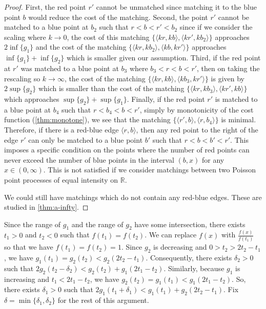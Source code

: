 \documentclass{article}
\newcommand{\R}{\mathbb{R}}
\begin{document}
\begin{proof}
    First, the red point $r'$ cannot be unmatched since
    matching it to the blue point $b$ would reduce the cost of the
    matching.
    Second, the point $r'$ cannot be matched to a blue point at $b_2$
    such that  $r<b<r'<b_2$ since
    if we consider the scaling where $k\rightarrow 0$, the cost of
    this matching $\{\langle kr,kb \rangle,\langle kr',kb_2 \rangle\}$ approaches $2\inf\{g_1\}$ and the cost of the matching $\{\langle kr,kb_2 \rangle,\langle kb,kr' \rangle\}$ approaches
    $\inf\{g_1\}+\inf\{g_2\}$ which is smaller given our assumption.
    Third, if the red point at $r'$ was matched to a blue point at
    $b_3$ where $b_3<r<b<r'$, then on taking the rescaling so
    $k\rightarrow\infty$, the cost of the matching $\{\langle kr,kb
    \rangle,\langle kb_3,kr' \rangle\}$ is given by $2\sup\{g_2\}$
    which is smaller than the cost of the matching $\{\langle kr,kb_3
    \rangle,\langle kr',kb \rangle\}$ which approaches
    $\sup\{g_2\}+\sup\{g_1\}$.
    Finally, if the red point $r'$ is matched to a blue point at $b_4$
    such that $r<b_4<b<r'$, simply by monotonicity of the cost function
    (\cref{thm:monotone}), we see that the matching $\{\langle r',b
    \rangle,\langle r,b_4 \rangle\}$ is minimal.
    Therefore, if there is a red-blue edge $\langle r,b \rangle$, then any red point to the
    right of the edge $r'$ can only be matched to a blue point $b'$
    such that $r<b<b'<r'$. This imposes a specific condition on the
    points where the number of red points can never exceed the number
    of blue points in the interval $(b,x)$ for any $x\in(0,\infty)$.
    This is not satisfied if we consider matchings between two Poisson
    point processes of equal intensity on $\R$.

    We could still have matchings which do not contain any red-blue
    edges. These are studied in \cref{thm:a-infty}.
  \end{proof}

  Since the range of
  $g_1$ and the range of $g_2$ have some intersection,
  there exists $t_1>0$ and $t_2<0$ such that $f(t_1)=f(t_2)$. We can replace $f(x)$ with
  $\frac{f(x)}{f(t_1)}$ so that we have  $f(t_1)=f(t_2)=1$.
  Since $g_2$ is decreasing and $0>t_2>2t_2-t_1$, we have $g_1(t_1) =
  g_2(t_2) < g_2(2t_2-t_1)$. Consequently, there exists $\delta_2>0$
  such that $2g_2(t_2-\delta_2) < g_2(t_2) + g_1(2t_1-t_2)$.
  Similarly, because $g_1$ is increasing and $t_1<2t_1-t_2$, we
  have $g_2(t_2)=g_1(t_1)< g_1(2t_1-t_2)$. So, there exists
  $\delta_1>0$ such that $2g_1(t_1+\delta_1)< g_1(t_1) +
  g_2(2t_2-t_1)$.
  Fix $\delta=\min{\{\delta_1,\delta_2}\}$ for the rest of this argument.
\end{document}
